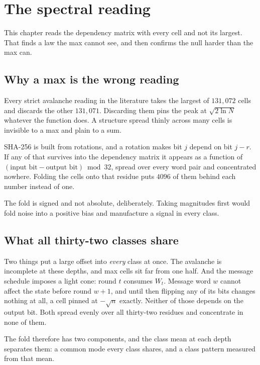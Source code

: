 \chapter{The spectral reading}

This chapter reads the dependency matrix with every cell and not its largest. That finds a law the max cannot see, and then confirms the null harder than the max can.

\section{Why a max is the wrong reading}

Every strict avalanche reading in the literature takes the largest of \(131{,}072\) cells and discards the other \(131{,}071\). Discarding them pins the peak at \(\sqrt{2 \ln N}\) whatever the function does. A structure spread thinly across many cells is invisible to a max and plain to a sum.

SHA-256 is built from rotations, and a rotation makes bit \(j\) depend on bit \(j - r\). If any of that survives into the dependency matrix it appears as a function of \((\text{input bit} - \text{output bit}) \bmod 32\), spread over every word pair and concentrated nowhere. Folding the cells onto that residue puts \(4096\) of them behind each number instead of one.

The fold is signed and not absolute, deliberately. Taking magnitudes first would fold noise into a positive bias and manufacture a signal in every class.

\section{What all thirty-two classes share}
\label{sec:commonmode}

Two things put a large offset into \emph{every} class at once. The avalanche is incomplete at these depths, and max cells sit far from one half. And the message schedule imposes a light cone: round \(t\) consumes \(W_t\). Message word \(w\) cannot affect the state before round \(w+1\), and until then flipping any of its bits changes nothing at all, a cell pinned at \(-\sqrt{n}\) exactly. Neither of those depends on the output bit. Both spread evenly over all thirty-two residues and concentrate in none of them.

The fold therefore has two components, and the class mean at each depth separates them: a common mode every class shares, and a class pattern measured from that mean.

